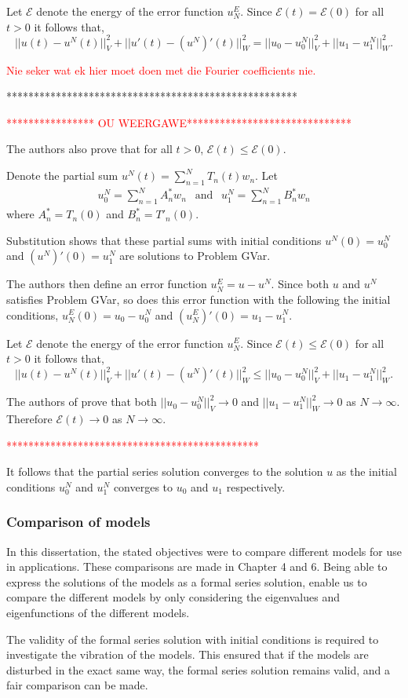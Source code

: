 \documentclass[../../main.tex]{subfiles}
\begin{document}
Let $\mathcal{E}$ denote the energy of the error function $u^E_N$. Since $\mathcal{E}(t) = \mathcal{E}(0)$ for all $t>0$ it follows that, \[||u(t) -  u^N(t)||_V^2 + ||u'(t) - (u^N)'(t)||^2_W = ||u_0 - u^N_0||_V^2 + ||u_1 - u^N_1||_W^2. \]

\textcolor{red}{Nie seker wat ek hier moet doen met die Fourier coefficients nie.}


*****************************************************

\textcolor{red}{**************** OU WEERGAWE******************************}

The authors also prove that for all $t>0$, $\mathcal{E}(t) \leq \mathcal{E}(0)$.

Denote the partial sum $u^{N}(t) = \sum_{n=1}^{N} T_{n}(t)w_n$. Let
\begin{eqnarray*}
	u_0^{N} = \sum_{n=1}^{N} A^*_n w_n \ \ \textrm{ and } \ \ u_{1}^{N} =\sum_{n=1}^{N} B^*_n w_n
\end{eqnarray*} where $A^*_n = T_n(0)$ and $B^*_n = T'_n(0)$.

Substitution shows that these partial sums with initial conditions $u^N(0) = u^N_0$ and $(u^N)'(0) = u^N_1$ are solutions to Problem GVar.

The authors then define an error function $u^E_N = u - u^N$. Since both $u$ and $u^N$ satisfies Problem GVar, so does this error function with the following the initial conditions, $u^E_N(0) = u_0 - u^N_0$ and $(u^E_N)'(0) = u_1 - u^N_1$.

Let $\mathcal{E}$ denote the energy of the error function $u^E_N$. Since $\mathcal{E}(t) \leq \mathcal{E}(0)$ for all $t>0$ it follows that, \[||u(t) -  u^N(t)||_V^2 + ||u'(t) - (u^N)'(t)||^2_W \leq ||u_0 - u^N_0||_V^2 + ||u_1 - u^N_1||_W^2. \]

The authors of \cite{CVV18} prove that both $||u_0 - u^N_0||_V^2 \rightarrow 0$ and $||u_1 - u^N_1||_W^2 \rightarrow 0$ as $N \rightarrow \infty$. Therefore $\mathcal{E}(t) \rightarrow 0$ as $N \rightarrow \infty$.

\textcolor{red}{**********************************************}



It follows that the partial series solution converges to the solution $u$ as the initial conditions $u_0^N$ and $u_1^N$ converges to $u_0$ and $u_1$ respectively.

\subsubsection{Comparison of models}

In this dissertation, the stated objectives were to compare different models for use in applications. These comparisons are made in Chapter 4 and 6. Being able to express the solutions of the models as a formal series solution, enable us to compare the different models by only considering the eigenvalues and eigenfunctions of the different models.

The validity of the formal series solution with initial conditions is required to investigate the vibration of the models. This ensured that if the models are disturbed in the exact same way, the formal series solution remains valid, and a fair comparison can be made.
\end{document}
